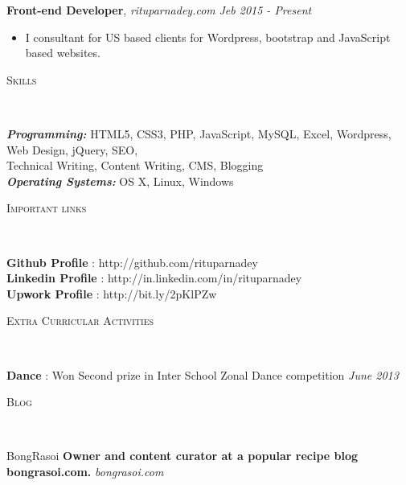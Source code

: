 \documentclass[9pt]{article}
\newenvironment{changemargin}[2]{%
  \begin{list}{}{%
    \setlength{\topsep}{0pt}%
    \setlength{\leftmargin}{#1}%
    \setlength{\rightmargin}{#2}%
    \setlength{\listparindent}{\parindent}%
    \setlength{\itemindent}{\parindent}%
    \setlength{\parsep}{\parskip}%
  }%
  \item[]}{\end{list}
}
\newcommand{\lineover}{
	\begin{changemargin}{-0.05in}{-0.05in}
		\vspace*{-8pt}
		\hrulefill \\
		\vspace*{-2pt}
	\end{changemargin}
}
\newcommand{\header}[1]{
	\begin{changemargin}{-0.5in}{-0.5in}
		\scshape{#1}\\
  	\lineover
	\end{changemargin}
}
\newenvironment{body} {
	\vspace*{-16pt}
	\begin{changemargin}{-0.25in}{-0.5in}
  }	
	{\end{changemargin}
}
\begin{document}
\begin{body}
	\vspace{14pt}
	\textbf{Front-end Developer}, \emph{rituparnadey.com} \hfill \emph{Jeb 2015 - Present}\\
	\begin{itemize}
		\item I consultant for US based clients for Wordpress, bootstrap and JavaScript based websites.\\
	\end{itemize}
	\vspace*{-4pt}
\end{body}

\smallskip


\header{Skills}

\begin{body}
	\vspace{14pt}
	\emph{\textbf{Programming:}}{} HTML5, CSS3, PHP, JavaScript, MySQL, Excel, Wordpress, Web Design, jQuery, SEO,\\
Technical Writing, Content Writing, CMS, Blogging\\
	\medskip
	\emph{\textbf{Operating Systems:}}{} OS X, Linux,  Windows\\
\end{body}

\smallskip


\header{Important links}

\begin{body}
	\vspace{14pt}
	\textbf{Github Profile} : http://github.com/rituparnadey \hfill{}\\
	\smallskip
	\textbf{Linkedin Profile} : http://in.linkedin.com/in/rituparnadey \hfill{}\\
	\textbf{Upwork Profile} : http://bit.ly/2pKlPZw \hfill{}\\
	\smallskip
\end{body}

\smallskip

\header{Extra Curricular Activities}

\begin{body}
	\vspace{14pt}
	\textbf{Dance} : Won Second prize in Inter School Zonal Dance competition \hfill {} \emph{June 2013}\\
	\smallskip
\end{body}

\smallskip

\header{Blog}

\begin{body}
	\vspace{14pt}
	BongRasoi \textbf{Owner and content curator at a popular recipe blog bongrasoi.com.} \emph{bongrasoi.com}\\
	\smallskip
\end{body}

\smallskip
\end{document}
